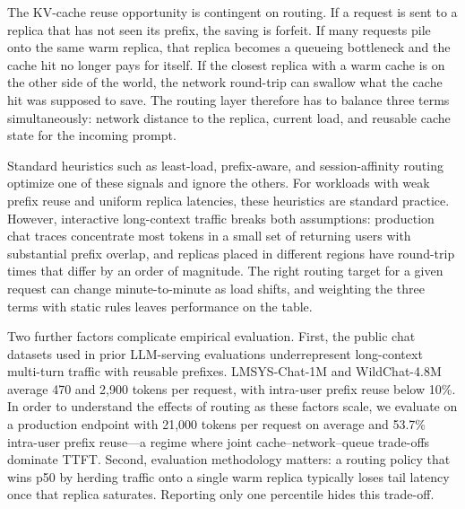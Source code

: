 \documentclass{article}
\begin{document}
The KV-cache reuse opportunity is contingent on routing. If a request is sent to
a replica that has not seen its prefix, the saving is forfeit. If many requests
pile onto the same warm replica, that replica becomes a queueing bottleneck and
the cache hit no longer pays for itself. If the closest replica with a warm cache
is on the other side of the world, the network round-trip can swallow what the
cache hit was supposed to save. The routing layer therefore has to balance three
terms simultaneously: network distance to the replica, current load, and
reusable cache state for the incoming prompt.

Standard heuristics such as least-load, prefix-aware, and session-affinity routing optimize one of these signals and ignore the others. For
workloads with weak prefix reuse and uniform replica latencies, these heuristics
are standard practice. However, interactive long-context traffic breaks both
assumptions: production chat traces concentrate most tokens in a small set of
returning users with substantial prefix overlap, and replicas placed in different
regions have round-trip times that differ by an order of magnitude. The right
routing target for a given request can change minute-to-minute as load shifts,
and weighting the three terms with static rules leaves performance on the table.

Two further factors complicate empirical evaluation. First, the public chat
datasets used in prior LLM-serving evaluations underrepresent long-context
multi-turn traffic with reusable prefixes. LMSYS-Chat-1M \citep{lmsys2024} and
WildChat-4.8M \citep{wildchat2024} average 470 and 2{,}900 tokens per request,
with intra-user prefix reuse below 10\%. In order to understand the effects of routing as these factors scale, we evaluate on a production endpoint with 21{,}000 tokens per request on average and 53.7\% intra-user prefix
reuse---a regime where joint cache--network--queue trade-offs dominate TTFT.
Second, evaluation methodology matters: a routing policy that wins p50 by
herding traffic onto a single warm replica typically loses tail latency once that
replica saturates. Reporting only one percentile hides this trade-off.
\end{document}
